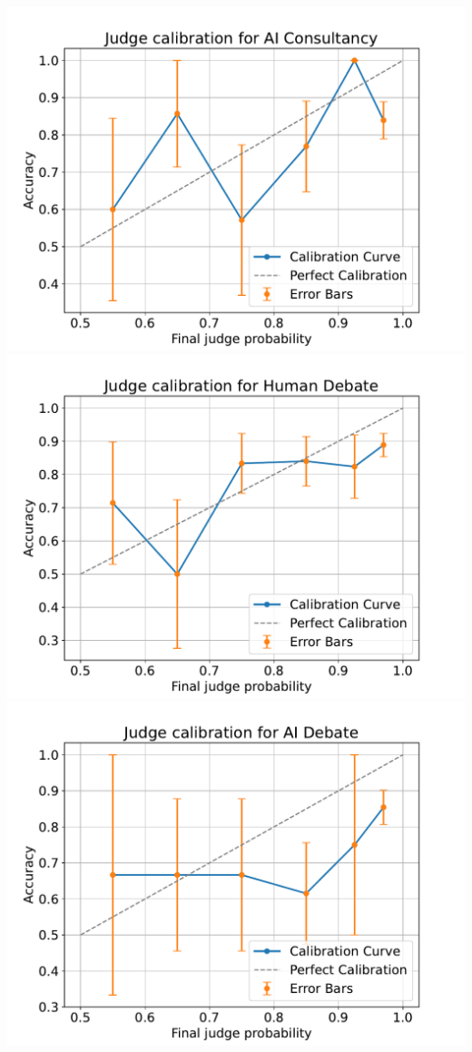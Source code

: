 \documentclass[
]{article}
\begin{document}
\includegraphics[width=1\linewidth]{debate-2309_files/figure-latex/calibration-1}
\includegraphics[width=1\linewidth]{debate-2309_files/figure-latex/calibration-2}
\includegraphics[width=1\linewidth]{debate-2309_files/figure-latex/calibration-3}
\end{document}
